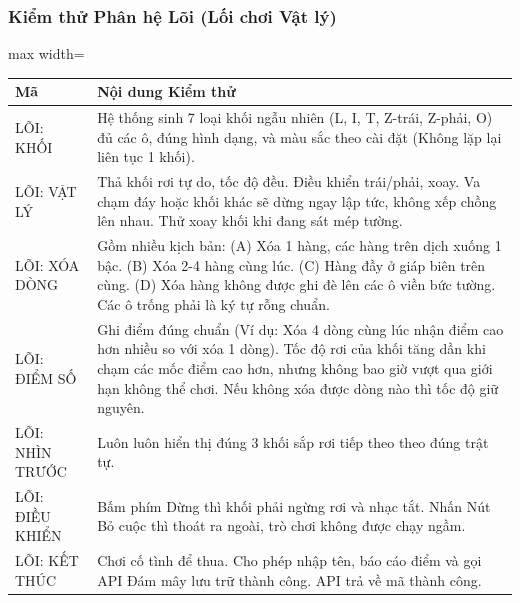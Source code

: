 \documentclass[12pt,a4paper]{article}
\begin{document}
\subsubsection{Kiểm thử Phân hệ Lõi (Lối chơi Vật lý)}
\begin{center}
\begin{adjustbox}{max width=\linewidth}
\begin{tabular}{|p{2cm}|p{11cm}|}
\hline
\rowcolor{gray!35}
\textbf{Mã} & \textbf{Nội dung Kiểm thử} \\ \hline
LÕI: KHỐI & Hệ thống sinh 7 loại khối ngẫu nhiên (L, I, T, Z-trái, Z-phải, O) đủ các ô, đúng hình dạng, và màu sắc theo cài đặt (Không lặp lại liên tục 1 khối). \\ \hline
LÕI: VẬT LÝ & Thả khối rơi tự do, tốc độ đều. Điều khiển trái/phải, xoay. Va chạm đáy hoặc khối khác sẽ dừng ngay lập tức, không xếp chồng lên nhau. Thử xoay khối khi đang sát mép tường. \\ \hline
LÕI: XÓA DÒNG & Gồm nhiều kịch bản: (A) Xóa 1 hàng, các hàng trên dịch xuống 1 bậc. (B) Xóa 2-4 hàng cùng lúc. (C) Hàng đầy ở giáp biên trên cùng. (D) Xóa hàng không được ghi đè lên các ô viền bức tường. Các ô trống phải là ký tự rỗng chuẩn.\\ \hline
LÕI: ĐIỂM SỐ & Ghi điểm đúng chuẩn (Ví dụ: Xóa 4 dòng cùng lúc nhận điểm cao hơn nhiều so với xóa 1 dòng). Tốc độ rơi của khối tăng dần khi chạm các mốc điểm cao hơn, nhưng không bao giờ vượt qua giới hạn không thể chơi. Nếu không xóa được dòng nào thì tốc độ giữ nguyên. \\ \hline
LÕI: NHÌN TRƯỚC & Luôn luôn hiển thị đúng 3 khối sắp rơi tiếp theo theo đúng trật tự. \\ \hline
LÕI: ĐIỀU KHIỂN & Bấm phím Dừng thì khối phải ngừng rơi và nhạc tắt. Nhấn Nút Bỏ cuộc thì thoát ra ngoài, trò chơi không được chạy ngầm. \\ \hline
LÕI: KẾT THÚC & Chơi cố tình để thua. Cho phép nhập tên, báo cáo điểm và gọi API Đám mây lưu trữ thành công. API trả về mã thành công. \\ \hline
\end{tabular}
\end{adjustbox}
\end{center}

\label{LastPageTesting}
\end{document}
